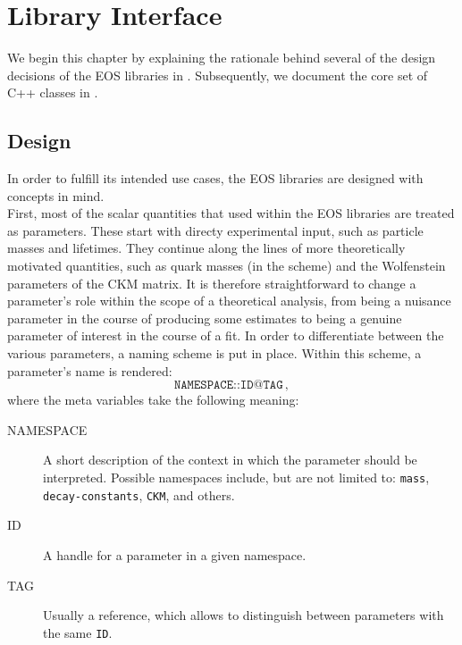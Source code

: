 
\chapter{Library Interface}
\label{ch:interface}

We begin this chapter by explaining the rationale behind several of the design decisions of the
EOS libraries in . Subsequently, we document the core set of C++ classes
in .


\section{Design}
\label{sec:interface:design}

In order to fulfill its intended use cases, the EOS libraries are designed with concepts in mind.\\

First, most of the scalar quantities that used within the EOS libraries are treated as parameters.
These start with directy experimental input, such as particle masses and lifetimes. They continue
along the lines of more theoretically motivated quantities, such as quark masses (in the \MSbar{}
scheme) and the Wolfenstein parameters of the CKM matrix. It is therefore straightforward to change
a parameter's role within the scope of a theoretical analysis, from being a nuisance parameter in
the course of producing some estimates to being a genuine parameter of interest in the course of a
fit. In order to differentiate between the various parameters, a naming scheme is put in place.
Within this scheme, a parameter's name is rendered:
\begin{equation}
    \texttt{NAMESPACE::ID@TAG}\,,
\end{equation}
where the meta variables take the following meaning:
\begin{description}
    \item[NAMESPACE] A short description of the context in which the parameter should be
        interpreted. Possible namespaces include, but are not limited to: \texttt{mass},
        \texttt{decay-constants}, \texttt{CKM}, and others. \\
    \item[ID] A handle for a parameter in a given namespace.\\
    \item[TAG] Usually a reference, which allows to distinguish between parameters with the same
        \texttt{ID}.\\
\end{description}

